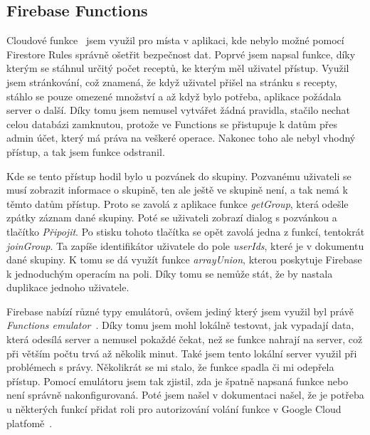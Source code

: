 \subsection{Firebase Functions}
Cloudové funkce~\cite{FirebaseFunctions} jsem využil pro místa v aplikaci, kde nebylo možné pomocí Firestore Rules správně ošetřit bezpečnost dat.
Poprvé jsem napsal funkce, díky kterým se stáhnul určitý počet receptů, ke kterým měl uživatel přístup. Využil jsem stránkování,
což znamená, že když uživatel přišel na stránku s recepty, stáhlo se pouze omezené množství a až když bylo potřeba, aplikace požádala
server o další. Díky tomu jsem nemusel vytvářet žádná pravidla, stačilo nechat celou databázi zamknutou, protože ve Functions se přistupuje
k datům přes admin účet, který má práva na veškeré operace. Nakonec toho ale nebyl vhodný přístup, a tak jsem funkce odstranil.

Kde se tento přístup hodil bylo u pozvánek do skupiny. Pozvanému uživateli se musí zobrazit informace o skupině, ten ale ještě ve skupině není,
a tak nemá k těmto datům přístup. Proto se zavolá z aplikace funkce \emph{getGroup}, která odešle zpátky záznam dané skupiny. Poté se uživateli
zobrazí dialog s pozvánkou a tlačítko \emph{Připojit}. Po stisku tohoto tlačítka se opět zavolá jedna z funkcí, tentokrát \emph{joinGroup}. Ta
zapíše identifikátor uživatele do pole \emph{userIds}, které je v dokumentu dané skupiny. K tomu se dá využít funkce \emph{arrayUnion}, kterou poskytuje
Firebase k jednoduchým operacím na poli. Díky tomu se nemůže stát, že by nastala duplikace jednoho uživatele.

Firebase nabízí různé typy emulátorů, ovšem jediný který jsem využil byl právě \emph{Functions emulator}~\cite{FirebaseEmulator}. Díky tomu jsem mohl lokálně testovat, jak vypadají
data, která odesílá server a nemusel pokaždé čekat, než se funkce nahrají na server, což při větším počtu trvá až několik minut. Také jsem tento lokální server
využil při problémech s právy. Několikrát se mi stalo, že funkce spadla či mi odepřela přístup. Pomocí emulátoru jsem tak zjistil, zda je špatně napsaná funkce
nebo není správně nakonfigurovaná. Poté jsem našel v dokumentaci našel, že je potřeba u některých funkcí přidat roli pro autorizování volání funkce v Google
Cloud platfomě~\cite{CloudRights}.


